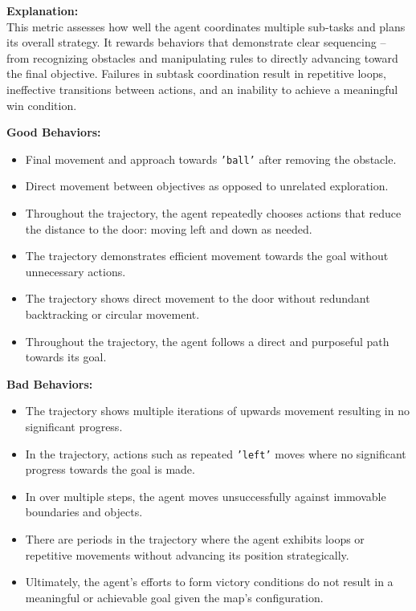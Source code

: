 \fontsize{9.5pt}{11pt}\selectfont
\begin{tcolorbox}[ colback=gray!5!white, colframe=gray!60, title=\textbf{\textcolor{black}{Iteration 2: Subtask Coordination and Overall Task Planning}}]
  
\textbf{Explanation:} \\
This metric assesses how well the agent coordinates multiple sub-tasks and plans its overall strategy. It rewards behaviors that demonstrate clear sequencing – from recognizing obstacles and manipulating rules to directly advancing toward the final objective. Failures in subtask coordination result in repetitive loops, ineffective transitions between actions, and an inability to achieve a meaningful win condition.

\vspace{1em}
\textbf{Good Behaviors:}
\begin{itemize}
    \item Final movement and approach towards \texttt{'ball'} after removing the obstacle.
    \item Direct movement between objectives as opposed to unrelated exploration.
    \item Throughout the trajectory, the agent repeatedly chooses actions that reduce the distance to the door: moving left and down as needed.
    \item The trajectory demonstrates efficient movement towards the goal without unnecessary actions.
    \item The trajectory shows direct movement to the door without redundant backtracking or circular movement.
    \item Throughout the trajectory, the agent follows a direct and purposeful path towards its goal.
\end{itemize}

\vspace{0.5em}
\textbf{Bad Behaviors:}
\begin{itemize}
    \item The trajectory shows multiple iterations of upwards movement resulting in no significant progress.
    \item In the trajectory, actions such as repeated \texttt{'left'} moves where no significant progress towards the goal is made.
    \item In over multiple steps, the agent moves unsuccessfully against immovable boundaries and objects.
    \item There are periods in the trajectory where the agent exhibits loops or repetitive movements without advancing its position strategically.
    \item Ultimately, the agent's efforts to form victory conditions do not result in a meaningful or achievable goal given the map's configuration.
\end{itemize}

\end{tcolorbox}

